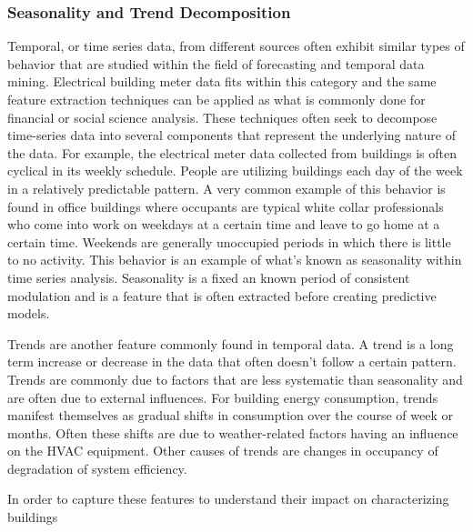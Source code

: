 \subsubsection{Seasonality and Trend Decomposition}
\label{sec:seasonaldecomposition}

Temporal, or time series data, from different sources often exhibit similar types of behavior that are studied within the field of forecasting and temporal data mining. Electrical building meter data fits within this category and the same feature extraction techniques can be applied as what is commonly done for financial or social science analysis. These techniques often seek to decompose time-series data into several components that represent the underlying nature of the data. For example, the electrical meter data collected from buildings is often cyclical in its weekly schedule. People are utilizing buildings each day of the week in a relatively predictable pattern. A very common example of this behavior is found in office buildings where occupants are typical white collar professionals who come into work on weekdays at a certain time and leave to go home at a certain time. Weekends are generally unoccupied periods in which there is little to no activity. This behavior is an example of what's known as seasonality within time series analysis. Seasonality is a fixed an known period of consistent modulation and is a feature that is often extracted before creating predictive models. 

Trends are another feature commonly found in temporal data. A trend is a long term increase or decrease in the data that often doesn't follow a certain pattern. Trends are commonly due to factors that are less systematic than seasonality and are often due to external influences. For building energy consumption, trends manifest themselves as gradual shifts in consumption over the course of week or months. Often these shifts are due to weather-related factors having an influence on the HVAC equipment. Other causes of trends are changes in occupancy of degradation of system efficiency. 

In order to capture these features to understand their impact on characterizing buildings